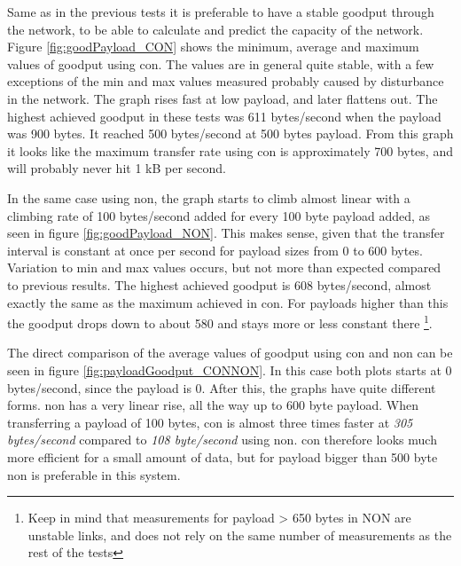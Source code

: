 \noindent Same as in the previous tests it is preferable to have a stable \gls{goodput} through the network, to be able to calculate and predict the capacity of the network. Figure \ref{fig:goodPayload_CON} shows the minimum, average and maximum values of \gls{goodput} using \gls{con}. The values are in general quite stable, with a few exceptions of the min and max values measured probably caused by disturbance in the network. The graph rises fast at low payload, and later flattens out. The highest achieved \gls{goodput} in these tests was 611 bytes/second when the \gls{payload} was 900 bytes. It reached 500 bytes/second at 500 bytes \gls{payload}. From this graph it looks like the maximum transfer rate using \gls{con} is approximately 700 bytes, and will probably never hit 1 kB per second. 

\noindent In the same case using \gls{non}, the graph starts to climb almost linear with a climbing rate of 100 bytes/second added for every 100 byte payload added, as seen in figure \ref{fig:goodPayload_NON}. This makes sense, given that the transfer interval is constant at once per second for \gls{payload} sizes from 0 to 600 bytes. Variation to min and max values occurs, but not more than expected compared to previous results. The highest achieved \gls{goodput} is 608 bytes/second, almost exactly the same as the maximum achieved in \gls{con}. For \glspl{payload} higher than this the \gls{goodput} drops down to about 580 and stays more or less constant there \footnote{Keep in mind that measurements for payload > 650 bytes in NON are unstable links, and does not rely on the same number of measurements as the rest of the tests}.


\noindent The direct comparison of the average values of \gls{goodput} using \gls{con} and \gls{non} can be seen in figure \ref{fig:payloadGoodput_CONNON}. In this case both plots starts at 0 bytes/second, since the payload is 0. After this, the graphs have quite different forms. \gls{non} has a very linear rise, all the way up to 600 byte payload. When transferring a payload of 100 bytes, \gls{con} is almost three times faster at \textit{305 bytes/second} compared to \textit{108 byte/second} using \gls{non}. \gls{con} therefore looks much more efficient for a small amount of data, but for payload bigger than 500 byte \gls{non} is preferable in this system.


